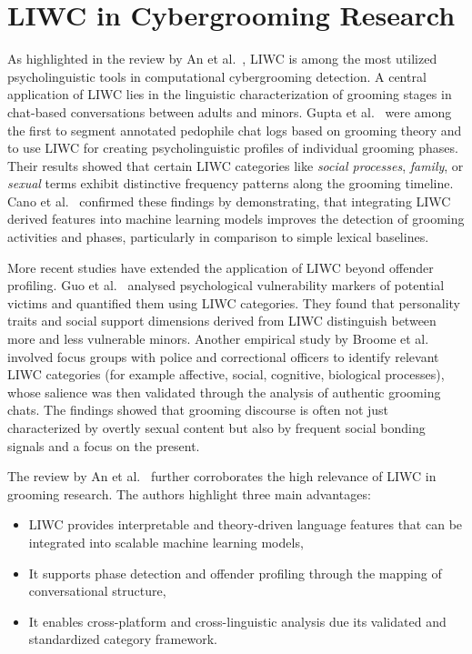 \section{LIWC in Cybergrooming Research}
 As highlighted in the review by An et al.~\cite{an2025cybergrooming}, LIWC is among the most utilized psycholinguistic tools in computational cybergrooming detection. 
 A central application of LIWC lies in the linguistic characterization of grooming stages in chat-based conversations between adults and minors. Gupta et al.~\cite{gupta2012characterizingpedophileconversationsinternet} were among the first to segment annotated pedophile chat logs based on grooming theory and to use LIWC for creating psycholinguistic profiles of individual grooming phases. Their results showed that certain LIWC categories like \textit{social processes}, \textit{family}, or \textit{sexual} terms exhibit distinctive frequency patterns along the grooming timeline. Cano et al.~\cite{Cano2014} confirmed these findings by demonstrating, that integrating LIWC derived features into machine learning models improves the detection of grooming activities and phases, particularly in comparison to simple lexical baselines. %

More recent studies have extended the application of LIWC beyond offender profiling. Guo et al.~\cite{guo2023text} analysed psychological vulnerability markers of potential victims and quantified them using LIWC categories. %
 They found that personality traits and social support dimensions derived from LIWC distinguish between more and less vulnerable minors.  %
 Another empirical study by Broome et al.~\cite{broome2020psycholinguistic} involved focus groups with police and correctional officers to identify relevant LIWC categories (for example affective, social, cognitive, biological processes), whose salience was then validated through the analysis of authentic grooming chats. The findings showed that grooming discourse is often not just characterized by overtly sexual content but also by frequent social bonding signals and a focus on the present. %

The review by An et al.~\cite{an2025cybergrooming} further corroborates the high relevance of LIWC in grooming research. The authors highlight three main advantages:
\begin{itemize}
    \item LIWC provides interpretable and theory-driven language features that can be integrated into scalable machine learning models,
    \item It supports phase detection and offender profiling through the mapping of conversational structure,
    \item It enables cross-platform and cross-linguistic analysis due its validated and standardized category framework.
\end{itemize} %

